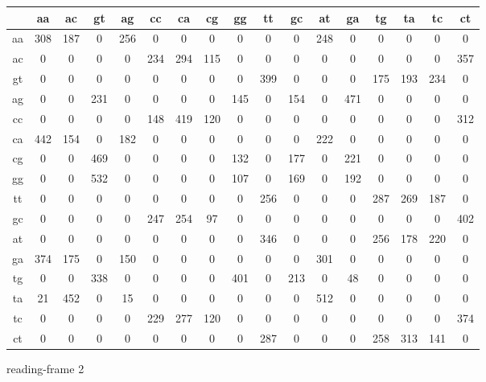 \documentclass{homework}
\begin{document}
\begin{enumerate}
\begin{enumerate}
\begin{tabular}{c|cccccccccccccccc}
   & aa & ac & gt & ag & cc & ca & cg & gg & tt & gc & at & ga & tg & ta & tc & ct\\\hline
aa & 308 & 187 &   0 & 256 &   0 &   0 &   0 &   0 &   0 &   0 & 248 &   0 &   0 &   0 &   0 &   0\\
ac &   0 &   0 &   0 &   0 & 234 & 294 & 115 &   0 &   0 &   0 &   0 &   0 &   0 &   0 &   0 & 357\\
gt &   0 &   0 &   0 &   0 &   0 &   0 &   0 &   0 & 399 &   0 &   0 &   0 & 175 & 193 & 234 &   0\\
ag &   0 &   0 & 231 &   0 &   0 &   0 &   0 & 145 &   0 & 154 &   0 & 471 &   0 &   0 &   0 &   0\\
cc &   0 &   0 &   0 &   0 & 148 & 419 & 120 &   0 &   0 &   0 &   0 &   0 &   0 &   0 &   0 & 312\\
ca & 442 & 154 &   0 & 182 &   0 &   0 &   0 &   0 &   0 &   0 & 222 &   0 &   0 &   0 &   0 &   0\\
cg &   0 &   0 & 469 &   0 &   0 &   0 &   0 & 132 &   0 & 177 &   0 & 221 &   0 &   0 &   0 &   0\\
gg &   0 &   0 & 532 &   0 &   0 &   0 &   0 & 107 &   0 & 169 &   0 & 192 &   0 &   0 &   0 &   0\\
tt &   0 &   0 &   0 &   0 &   0 &   0 &   0 &   0 & 256 &   0 &   0 &   0 & 287 & 269 & 187 &   0\\
gc &   0 &   0 &   0 &   0 & 247 & 254 &  97 &   0 &   0 &   0 &   0 &   0 &   0 &   0 &   0 & 402\\
at &   0 &   0 &   0 &   0 &   0 &   0 &   0 &   0 & 346 &   0 &   0 &   0 & 256 & 178 & 220 &   0\\
ga & 374 & 175 &   0 & 150 &   0 &   0 &   0 &   0 &   0 &   0 & 301 &   0 &   0 &   0 &   0 &   0\\
tg &   0 &   0 & 338 &   0 &   0 &   0 &   0 & 401 &   0 & 213 &   0 &  48 &   0 &   0 &   0 &   0\\
ta &  21 & 452 &   0 &  15 &   0 &   0 &   0 &   0 &   0 &   0 & 512 &   0 &   0 &   0 &   0 &   0\\
tc &   0 &   0 &   0 &   0 & 229 & 277 & 120 &   0 &   0 &   0 &   0 &   0 &   0 &   0 &   0 & 374\\
ct &   0 &   0 &   0 &   0 &   0 &   0 &   0 &   0 & 287 &   0 &   0 &   0 & 258 & 313 & 141 &   0\\
\end{tabular}

\normalsize
reading-frame 2
\tiny


\end{enumerate}
\end{enumerate}
\end{document}
